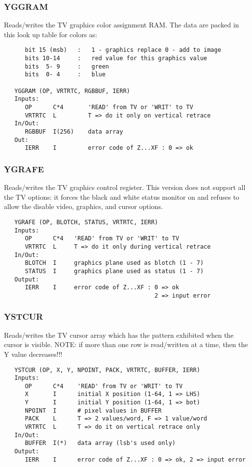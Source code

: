 \subsubsection{YGGRAM}
Reads/writes the TV graphics color assignment RAM.  The
data are packed in this look up table for colors as:
\begin{verbatim}
      bit 15 (msb)   :   1 - graphics replace 0 - add to image
      bits 10-14     :   red value for this graphics value
      bits  5- 9     :   green
      bits  0- 4     :   blue

   YGGRAM (OP, VRTRTC, RGBBUF, IERR)
   Inputs:
      OP      C*4       'READ' from TV or 'WRIT' to TV
      VRTRTC  L         T => do it only on vertical retrace
   In/Out:
      RGBBUF  I(256)    data array
   Out:
      IERR    I         error code of Z...XF : 0 => ok

\end{verbatim}

\subsubsection{YGRAFE}
Reads/writes the TV graphics control register.  This
version does not support all the TV options: it forces the
black and white status monitor on and refuses to allow the disable
video, graphics, and cursor options.
\begin{verbatim}
   YGRAFE (OP, BLOTCH, STATUS, VRTRTC, IERR)
   Inputs:
      OP      C*4   'READ' from TV or 'WRIT' to TV
      VRTRTC  L     T => do it only during vertical retrace
   In/Out:
      BLOTCH  I     graphics plane used as blotch (1 - 7)
      STATUS  I     graphics plane used as status (1 - 7)
   Output:
      IERR    I     error code of Z...XF : 0 => ok
                                           2 => input error

\end{verbatim}

\subsubsection{YSTCUR}
Reads/writes the TV cursor array which has the pattern
exhibited when the cursor is visible.  NOTE: if more than one
row is read/written at a time, then the Y value decreases!!!
\begin{verbatim}
   YSTCUR (OP, X, Y, NPOINT, PACK, VRTRTC, BUFFER, IERR)
   Inputs:
      OP      C*4    'READ' from TV or 'WRIT' to TV
      X       I      initial X position (1-64, 1 => LHS)
      Y       I      initial Y position (1-64, 1 => bot)
      NPOINT  I      # pixel values in BUFFER
      PACK    L      T => 2 values/word, F => 1 value/word
      VRTRTC  L      T => do it on vertical retrace only
   In/Out:
      BUFFER  I(*)   data array (lsb's used only)
   Output:
      IERR    I      error code of Z...XF : 0 => ok, 2 => input error

\end{verbatim}



